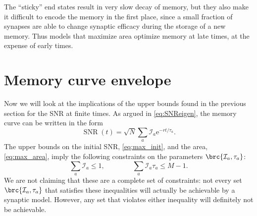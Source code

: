 \documentclass[9pt,twocolumn,twoside,lineno]{pnas-new}
\newcommand{\e}{\mathrm{e}}
\DeclareMathOperator{\snr}{SNR}
\newcommand{\CI}{\mathcal{I}}
\providecommand\hyperref[2][1]{#2}
\begin{document}
The ``sticky'' end states result in very slow decay of memory, but they also make it difficult to encode the memory in the first place, since a small fraction of synapses are able to change synaptic efficacy during the storage of a new memory.
Thus models that maximize area optimize memory at late times, at the expense of early times.




\section{Memory curve envelope}\label{sec:env}

Now we will look at the implications of the upper bounds found in the \hyperref[sec:bounds]{previous section} for the SNR at finite times.
As argued in \cref{eq:SNReigen}, the memory curve can be written in the form
%
\begin{equation}\label{eq:SNRmodes}
  \snr(t) = \sqrt{N}\sum_a \CI_a \e^{-rt/\tau_a}.
\end{equation}
%
The upper bounds on the initial SNR, \cref{eq:max_init}, and the area, \cref{eq:max_area}, imply the following constraints on the parameters $\brc{\CI_a,\tau_a}$:
%
\begin{equation}\label{eq:modeconstr}
  \sum_a \CI_a \leq 1,
  \qquad\qquad
  \sum_a \CI_a \tau_a \leq M-1.
\end{equation}
%
We are not claiming that these are a complete set of constraints: not every set $\brc{\CI_a,\tau_a}$ that satisfies these inequalities will actually be achievable by a synaptic model.
However, any set that violates either inequality will definitely not be achievable.
\end{document}
